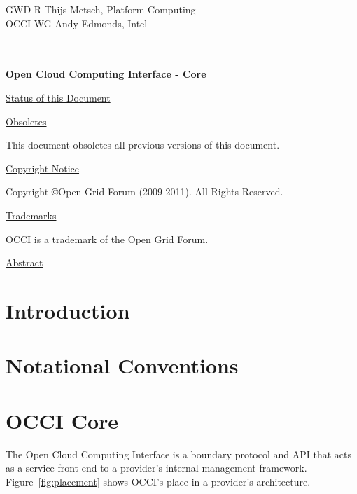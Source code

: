 \documentclass[10pt,a4paper]{article}
\begin{document}
\thispagestyle{empty}

GWD-R \hfill  Thijs Metsch, Platform Computing\\
OCCI-WG \hfill  Andy Edmonds, Intel\\
\\
\\

\vspace*{0.5in}

\begin{Large}
\textbf{Open Cloud Computing Interface - Core}
\end{Large}

\vspace*{0.5in}

\underline{Status of this Document}



\underline{Obsoletes}

This document obsoletes all previous versions of this document.

\underline{Copyright Notice}

Copyright \copyright Open Grid Forum (2009-2011). All Rights Reserved.

\underline{Trademarks}

OCCI is a trademark of the Open Grid Forum.

\underline{Abstract}



\newpage
\tableofcontents
\newpage

\section{Introduction}


\section{Notational Conventions}


\section{OCCI Core}
The Open Cloud Computing Interface is a boundary protocol and API that
acts as a service front-end to a provider's internal management
framework. Figure~\ref{fig:placement} shows OCCI's place in a
provider's architecture.
\end{document}
